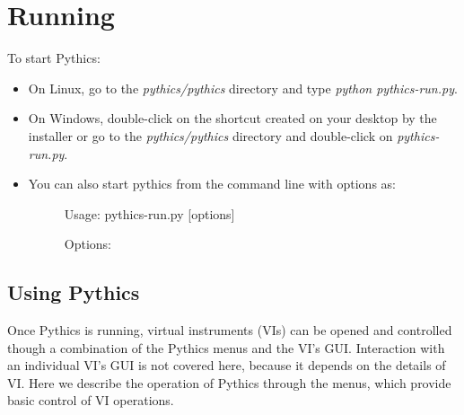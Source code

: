 \documentclass[letterpaper,10pt,english]{sphinxmanual}
\begin{document}
\section{Running}
\label{getting_started:running}
To start Pythics:
\begin{itemize}
\item {} 
On Linux, go to the \emph{pythics/pythics} directory and type
\emph{python pythics-run.py}.

\item {} 
On Windows, double-click on the shortcut created on your desktop by the
installer or go to the \emph{pythics/pythics} directory and double-click on
\emph{pythics-run.py}.

\item {} \begin{description}
\item[{You can also start pythics from the command line with options as:}] \leavevmode
Usage: pythics-run.py {[}options{]}

Options:

\end{description}

\end{itemize}


\subsection{Using Pythics}
\label{getting_started:using-pythics}
Once Pythics is running, virtual instruments (VIs) can be opened and controlled
though a combination of the Pythics menus and the VI's GUI. Interaction with an
individual VI's GUI is not covered here, because it depends on the details of
VI. Here we describe the operation of Pythics through the menus, which provide
basic control of VI operations.
\end{document}
